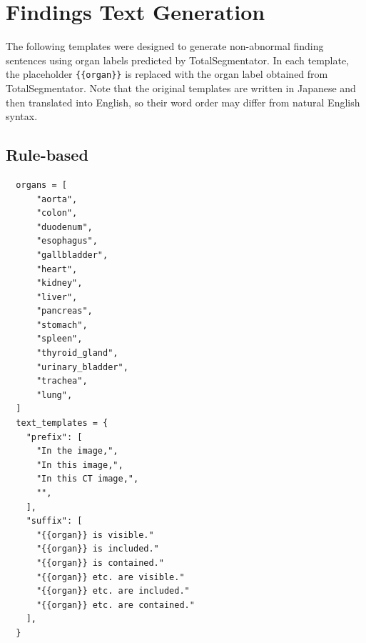 \documentclass[bioengineering,article,submit,pdftex,moreauthors]{Definitions/mdpi}
\begin{document}
\appendixstart
\appendix
\section{Findings Text Generation}\label{app:rule_based_text_prompt}
The following templates were designed to generate non-abnormal finding sentences using organ labels predicted by TotalSegmentator. 
In each template, the placeholder \texttt{\{\{organ\}\}} is replaced with the organ label obtained from TotalSegmentator. 
Note that the original templates are written in Japanese and then translated into English, so their word order may differ from natural English syntax.
\subsection{Rule-based}
\begin{verbatim}
  organs = [
      "aorta",
      "colon",
      "duodenum",
      "esophagus",
      "gallbladder",
      "heart",
      "kidney",
      "liver",
      "pancreas",
      "stomach",
      "spleen",
      "thyroid_gland",
      "urinary_bladder",
      "trachea",
      "lung",
  ]
  text_templates = {
    "prefix": [
      "In the image,",
      "In this image,",
      "In this CT image,",
      "",
    ],
    "suffix": [
      "{{organ}} is visible."
      "{{organ}} is included."
      "{{organ}} is contained."
      "{{organ}} etc. are visible."
      "{{organ}} etc. are included."
      "{{organ}} etc. are contained."
    ],
  }
\end{verbatim}
\end{document}

